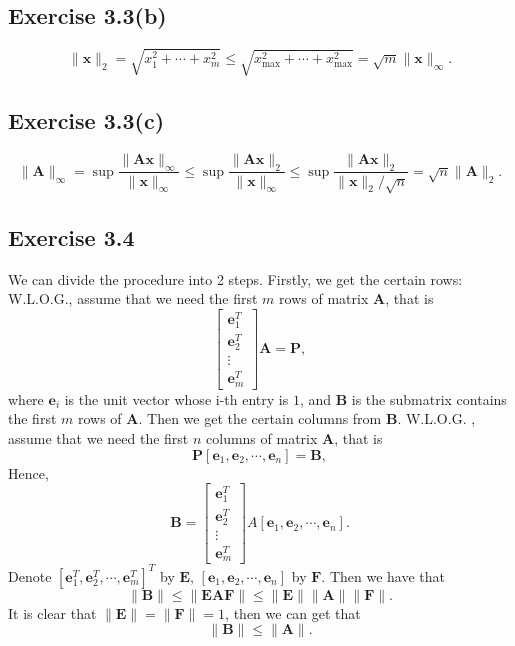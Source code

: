 \documentclass{article}
\begin{document}
    \subsection{Exercise 3.3(b)} 
        $$
        \| \bm{x}\|_2 = \sqrt{x_1^2 + \cdots + x_m^2} \leq \sqrt{x^2_{\max} + \cdots + x_{\max}^2} = \sqrt{m} \| \bm{x} \|_{\infty}.
        $$
    

    \subsection{Exercise 3.3(c)} 
        $$
        \|\bm{A}\|_{\infty}  = \sup \frac{\| \bm{Ax} \|_{\infty}}{\|\bm{x}\|_{\infty}}
    	\leq \sup \frac{\| \bm{Ax} \|_{2}}{\|\bm{x}\|_{\infty}} 
        \leq \sup \frac{\| \bm{Ax} \|_{2}}{\|\bm{x}\|_{2}/\sqrt{n}}
        = \sqrt{n} \| \bm{A} \|_2.
        $$

\subsection{Exercise 3.4} 
        We can divide the procedure into 2 steps. Firstly, we get the certain rows: W.L.O.G., assume that we need
        the first $m$ rows of matrix $\bm{A}$, that is
        $$
        \begin{bmatrix}
            \bm{e}^T_1 \\
            \bm{e}^T_2 \\
            \vdots \\
            \bm{e}^T_m
        \end{bmatrix} \bm{A} = \bm{P},
        $$
        where $\bm{e}_i$ is the unit vector whose i-th entry is $1$, and $\bm{B}$ is the submatrix contains the first $m$ rows of $\bm{A}$. Then
        we get the certain columns from $\bm{B}$. W.L.O.G. , assume that we need the first $n$ columns of matrix $\bm{A}$, that is  
        $$
        \bm{P} [\bm{e}_1, \bm{e}_2 ,\cdots, \bm{e}_n ] = \bm{B},
        $$
        Hence,
        $$
        \bm{B} = \begin{bmatrix}
            \bm{e}^T_1 \\
            \bm{e}^T_2 \\
            \vdots \\
            \bm{e}^T_m
        \end{bmatrix} A [\bm{e}_1, \bm{e}_2 ,\cdots, \bm{e}_n ].
        $$
        Denote $ [\bm{e}^T_1, \bm{e}^T_2 ,\cdots, \bm{e}^T_m ]^{T} $ by $\bm{E}$, $[\bm{e}_1, \bm{e}_2 ,\cdots, \bm{e}_n ]$ by $\bm{F}$. Then we have that
        $$
        \| \bm{B}\| \leq \|\bm{EAF} \| \leq \| \bm{E} \| \| \bm{A} \| \| \bm{F} \|.
        $$
        It is clear that $\| \bm{E}\| = \| \bm{F} \| = 1$, then we can get that
        $$
        \| \bm{B} \| \leq \| \bm{A} \|.
        $$
\end{document}
